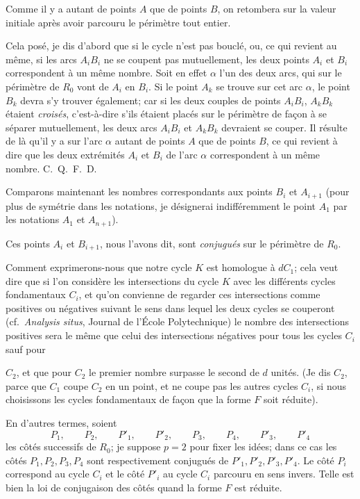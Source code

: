 \documentclass{article}
\begin{document}
Comme il y a autant de points $A$ que de points $B$, on retombera sur la valeur initiale après avoir parcouru le périmètre tout entier.

Cela posé, je dis d'abord que si le cycle n'est pas bouclé, ou, ce qui revient au même, si les arcs $A_{i}B_{i}$ ne se coupent pas mutuellement, les deux points $A_{i}$ et $B_{i}$ correspondent à un même nombre. Soit en effet $\alpha$ l'un des deux arcs, qui sur le périmètre de $R_{0}$ vont de $A_{i}$ en $B_{i}$. Si le point $A_{k}$ se trouve sur cet arc $\alpha$, le point $B_{k}$ devra s'y trouver également; car si les deux couples de points $A_{i}B_{i}$, $A_{k}B_{k}$ étaient \emph{croisés}, c'est-à-dire s'ils étaient placés sur le périmètre de façon à se séparer mutuellement, les deux arcs $A_{i}B_{i}$ et $A_{k}B_{k}$ devraient se couper. Il résulte de là qu'il y a sur l'arc $\alpha$ autant de points $A$ que de points $B$, ce qui revient à dire que les deux extrémités $A_{i}$ et $B_{i}$ de l'arc $\alpha$ correspondent à un même nombre. C.~Q.~F.~D.

Comparons maintenant les nombres correspondants aux points $B_{i}$ et $A_{i+1}$ (pour plus de symétrie dans les notations, je désignerai indifféremment le point $A_{1}$ par les notations $A_{1}$ et $A_{n+1}$).

Ces points $A_{i}$ et $B_{i+1}$, nous l'avons dit, sont \emph{conjugués} sur le périmètre de $R_{0}$.

Comment exprimerons-nous que notre cycle $K$ est homologue à $dC_{1}$; cela veut dire que si l'on considère les intersections du cycle $K$ avec les différents cycles fondamentaux $C_{i}$, et qu'on convienne de regarder ces intersections comme positives ou négatives suivant le sens dans lequel les deux cycles se couperont (cf.\ \emph{Analysis situs}, Journal de l'École Polytechnique) le nombre des intersections positives sera le même que celui des intersections négatives pour tous les cycles $C_{i}$ sauf pour

$C_{2}$, et que pour $C_{2}$ le premier nombre surpasse le second de $d$ unités. (Je dis $C_{2}$, parce que $C_{1}$ coupe $C_{2}$ en un point, et ne coupe pas les autres cycles $C_{i}$, si nous choisissons les cycles fondamentaux de façon que la forme $F$ soit réduite).

En d'autres termes, soient
\[ P_{1}, \qquad P_{2}, \qquad P'_{1}, \qquad P'_{2}, \qquad P_{3}, \qquad P_{4}, \qquad P'_{3}, \qquad P'_{4} \]
les côtés successifs de $R_{0}$; je suppose $p = 2$ pour fixer les idées; dans ce cas les côtés $P_{1}, P_{2}, P_{3}, P_{4}$ sont respectivement conjugués de $P'_{1}, P'_{2}, P'_{3}, P'_{4}$. Le côté $P_{i}$ correspond au cycle $C_{i}$ et le côté $P'_{i}$ au cycle $C_{i}$ parcouru en sens invers. Telle est bien la loi de conjugaison des côtés quand la forme $F$ est réduite.
\end{document}
